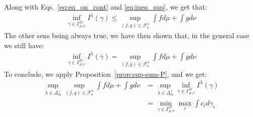 \begin{prv*}
Along with Eqs.~\ref{eq:eq_on_cont} and \ref{eq:ineq_sup}, we get that:
\begin{align*}
\inf_{\gamma\in \Gamma^N_{\mu,\nu}}I^\lambda(\gamma)\leq\sup\limits_{(f,g)\in\mathcal{F}^\lambda_\mathbf{c}}\int fd\mu+\int gd\nu
\end{align*}
The other sens being always true, we have then  shown that, in the general case we still have:
\begin{align*}
    \inf_{\gamma\in \Gamma^N_{\mu,\nu}}I^\lambda(\gamma)=\sup\limits_{(f,g)\in\mathcal{F}^\lambda_\mathbf{c}}\int fd\mu+\int gd\nu
\end{align*}
To conclude, we apply Proposition~\ref{prop:sup-sum-P}, and we get: 
\begin{align*}
\sup_{\lambda\in\Delta_N^{+}} \sup\limits_{(f,g)\in\mathcal{F}^\lambda_\mathbf{c}}\int fd\mu+\int gd\nu &=\sup_{\lambda\in\Delta_N^{+}} \inf_{\gamma\in \Gamma^N_{\mu,\nu}}I^\lambda(\gamma)\\
&= \min_{\gamma\in \Gamma^N_{\mu,\nu}}\max_i \int c_id\gamma_i\\
\end{align*}

\end{prv*}


